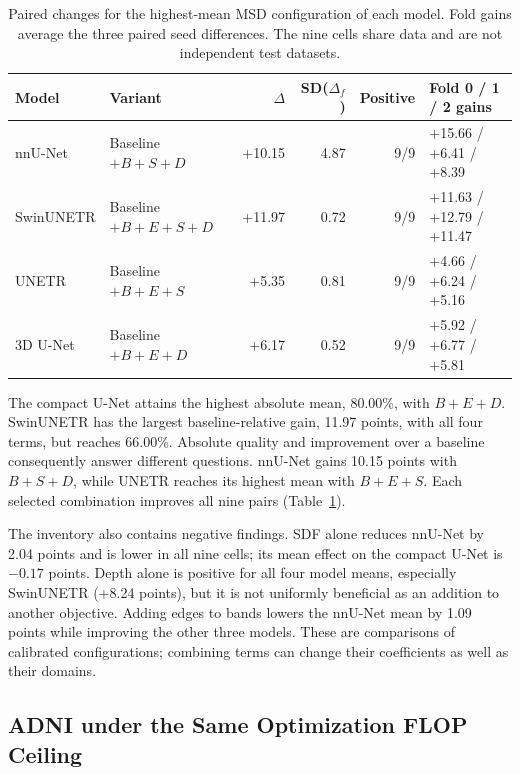 \documentclass[12pt,a4paper]{article}
\begin{document}
\begin{table}[htbp]
\centering\footnotesize{}
\setlength{\tabcolsep}{5pt}
\renewcommand{\arraystretch}{1.15}
\begin{tabular}{@{}llrrrl@{}}
\hline
Model & Variant & $\Delta$ & SD($\Delta_f$) & Positive & Fold 0 / 1 / 2 gains \\
\hline
nnU-Net & Baseline $+B+S+D$ & +10.15 & 4.87 & 9/9 & +15.66 / +6.41 / +8.39 \\
SwinUNETR & Baseline $+B+E+S+D$ & +11.97 & 0.72 & 9/9 & +11.63 / +12.79 / +11.47 \\
UNETR & Baseline $+B+E+S$ & +5.35 & 0.81 & 9/9 & +4.66 / +6.24 / +5.16 \\
3D U-Net & Baseline $+B+E+D$ & +6.17 & 0.52 & 9/9 & +5.92 / +6.77 / +5.81 \\
\hline
\end{tabular}
\caption{Paired changes for the highest-mean MSD configuration of each model. Fold gains average the three paired seed differences. The nine cells share data and are not independent test datasets.}
\label{tab:msd-noaug-best}
\end{table}

The compact U-Net attains the highest absolute mean, 80.00\%, with
$B+E+D$. SwinUNETR has the largest baseline-relative gain, 11.97
points, with all four terms, but reaches 66.00\%. Absolute quality
and improvement over a baseline consequently answer different questions.
nnU-Net gains 10.15 points with $B+S+D$, while UNETR reaches its highest
mean with $B+E+S$. Each selected combination improves all nine pairs
(Table~\ref{tab:msd-noaug-best}).

The inventory also contains negative findings. SDF alone reduces
nnU-Net by 2.04 points and is lower in all nine cells; its mean effect
on the compact U-Net is $-0.17$ points. Depth alone is positive for
all four model means, especially SwinUNETR (+8.24 points), but it is
not uniformly beneficial as an addition to another objective. Adding
edges to bands lowers the nnU-Net mean by 1.09 points while improving
the other three models. These are comparisons of calibrated configurations;
combining terms can change their coefficients as well as their domains.


\FloatBarrier
\subsection{ADNI under the Same Optimization FLOP Ceiling}
\label{sec:adni-results}
\end{document}
